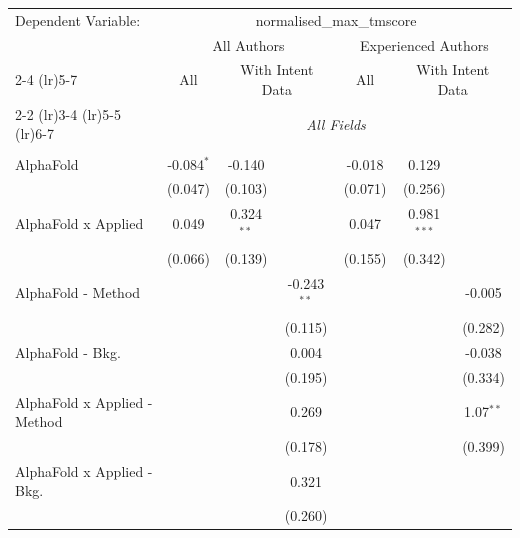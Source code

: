 \begingroup
\centering
\begin{tabular}{lcccccc}
   \tabularnewline \midrule \midrule
   Dependent Variable: & \multicolumn{6}{c}{normalised\_max\_tmscore}\\
 & \multicolumn{3}{c}{All Authors} & \multicolumn{3}{c}{Experienced Authors} \\
\cmidrule(lr){2-4} \cmidrule(lr){5-7}
 & \multicolumn{1}{c}{All} & \multicolumn{2}{c}{With Intent Data} & \multicolumn{1}{c}{All} & \multicolumn{2}{c}{With Intent Data} \\
\cmidrule(lr){2-2} \cmidrule(lr){3-4} \cmidrule(lr){5-5} \cmidrule(lr){6-7}
 & \multicolumn{6}{c}{\textit{All Fields}} \\ \\
   AlphaFold                      & -0.084$^{*}$ & -0.140       &               & -0.018  & 0.129         &   \\   
                                  & (0.047)      & (0.103)      &               & (0.071) & (0.256)       &   \\   
   AlphaFold x Applied            & 0.049        & 0.324$^{**}$ &               & 0.047   & 0.981$^{***}$ &   \\   
                                  & (0.066)      & (0.139)      &               & (0.155) & (0.342)       &   \\   
   AlphaFold - Method             &              &              & -0.243$^{**}$ &         &               & -0.005\\   
                                  &              &              & (0.115)       &         &               & (0.282)\\   
   AlphaFold - Bkg.               &              &              & 0.004         &         &               & -0.038\\   
                                  &              &              & (0.195)       &         &               & (0.334)\\   
   AlphaFold x Applied - Method   &              &              & 0.269         &         &               & 1.07$^{**}$\\   
                                  &              &              & (0.178)       &         &               & (0.399)\\   
   AlphaFold x Applied - Bkg.     &              &              & 0.321         &         &               &   \\   
                                  &              &              & (0.260)       &         &               &   \\   

\end{tabular}
